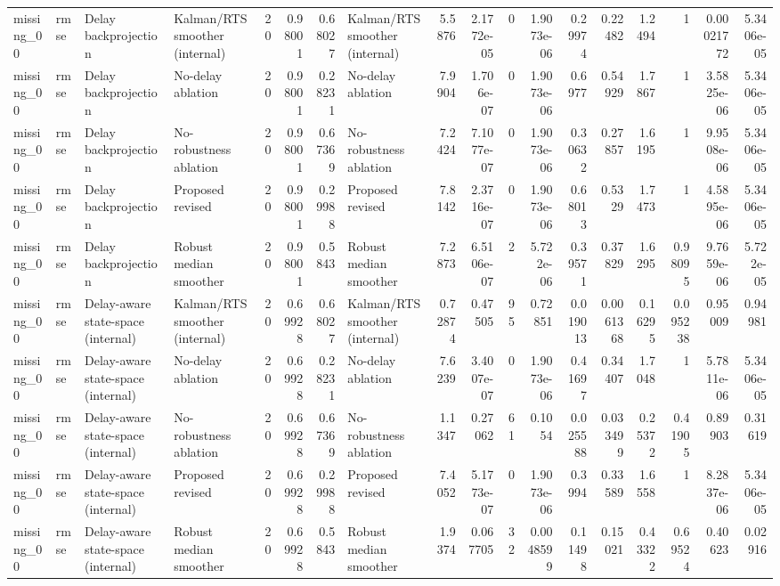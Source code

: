 \begin{table}[!htbp]
{\begin{tabular}{llllrrrlrrrrrrrrrr}
missing_00 & rmse & Delay backprojection & Kalman/RTS smoother (internal) & 20 & 0.98001 & 0.68027 & Kalman/RTS smoother (internal) & 5.5876 & 2.1772e-05 & 0 & 1.9073e-06 & 0.29974 & 0.22482 & 1.2494 & 1 & 0.00021772 & 5.3406e-05 \\
missing_00 & rmse & Delay backprojection & No-delay ablation & 20 & 0.98001 & 0.28231 & No-delay ablation & 7.9904 & 1.706e-07 & 0 & 1.9073e-06 & 0.6977 & 0.54929 & 1.7867 & 1 & 3.5825e-06 & 5.3406e-05 \\
missing_00 & rmse & Delay backprojection & No-robustness ablation & 20 & 0.98001 & 0.67369 & No-robustness ablation & 7.2424 & 7.1077e-07 & 0 & 1.9073e-06 & 0.30632 & 0.27857 & 1.6195 & 1 & 9.9508e-06 & 5.3406e-05 \\
missing_00 & rmse & Delay backprojection & Proposed revised & 20 & 0.98001 & 0.29988 & Proposed revised & 7.8142 & 2.3716e-07 & 0 & 1.9073e-06 & 0.68013 & 0.5329 & 1.7473 & 1 & 4.5895e-06 & 5.3406e-05 \\
missing_00 & rmse & Delay backprojection & Robust median smoother & 20 & 0.98001 & 0.5843 & Robust median smoother & 7.2873 & 6.5106e-07 & 2 & 5.722e-06 & 0.39571 & 0.37829 & 1.6295 & 0.98095 & 9.7659e-06 & 5.722e-05 \\
missing_00 & rmse & Delay-aware state-space (internal) & Kalman/RTS smoother (internal) & 20 & 0.69928 & 0.68027 & Kalman/RTS smoother (internal) & 0.72874 & 0.47505 & 95 & 0.72851 & 0.019013 & 0.0061368 & 0.16295 & 0.095238 & 0.95009 & 0.94981 \\
missing_00 & rmse & Delay-aware state-space (internal) & No-delay ablation & 20 & 0.69928 & 0.28231 & No-delay ablation & 7.6239 & 3.4007e-07 & 0 & 1.9073e-06 & 0.41697 & 0.34407 & 1.7048 & 1 & 5.7811e-06 & 5.3406e-05 \\
missing_00 & rmse & Delay-aware state-space (internal) & No-robustness ablation & 20 & 0.69928 & 0.67369 & No-robustness ablation & 1.1347 & 0.27062 & 61 & 0.1054 & 0.025588 & 0.033499 & 0.25372 & 0.41905 & 0.89903 & 0.31619 \\
missing_00 & rmse & Delay-aware state-space (internal) & Proposed revised & 20 & 0.69928 & 0.29988 & Proposed revised & 7.4052 & 5.1773e-07 & 0 & 1.9073e-06 & 0.3994 & 0.33589 & 1.6558 & 1 & 8.2837e-06 & 5.3406e-05 \\
missing_00 & rmse & Delay-aware state-space (internal) & Robust median smoother & 20 & 0.69928 & 0.5843 & Robust median smoother & 1.9374 & 0.067705 & 32 & 0.0048599 & 0.11498 & 0.15021 & 0.43322 & 0.69524 & 0.40623 & 0.02916 \\

\end{tabular}}
\end{table}

